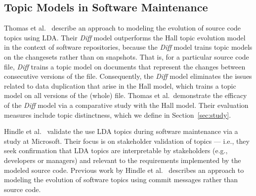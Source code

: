 \subsection{Topic Models in Software Maintenance}


Thomas et al.~\cite{Thomas-etal:2011} describe an approach to modeling the evolution of source code topics using LDA. Their \textit{Diff} model outperforms the Hall topic evolution model~\cite{Hall_etal:2008} in the context of software repositories, because the \textit{Diff} model trains topic models on the changesets rather than on snapshots. That is, for a particular source code file, \textit{Diff} trains a topic model on documents that represent the changes between consecutive versions of the file. Consequently, the \textit{Diff} model eliminates the issues related to data duplication that arise in the Hall model, which trains a topic model on all versions of the (whole) file. Thomas et al.\ demonstrate the efficacy of the \textit{Diff} model via a comparative study with the Hall model. Their evaluation measures include topic distinctness, which we define in Section~\ref{sec:study}.

Hindle et al.~\cite{Hindle_etal:2012} validate the use LDA topics during software maintenance via a study at Microsoft. Their focus is on stakeholder validation of topics --- i.e., they seek confirmation that LDA topics are interpretable by stakeholders (e.g., developers or managers) and relevant to the requirements implemented by the modeled source code. Previous work by Hindle et al.~\cite{Hindle-etal:2009} describes an approach to modeling the evolution of software topics using commit messages rather than source code.

